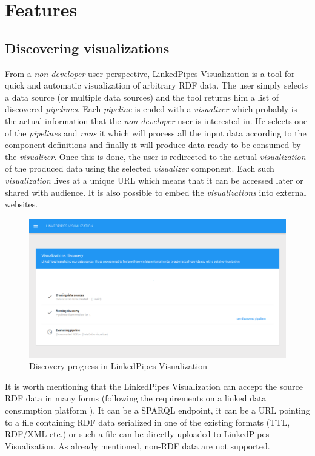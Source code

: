 \section{Features}

\subsection{Discovering visualizations}

From a \emph{non-developer} user perspective, LinkedPipes Visualization is a tool for quick and automatic visualization of arbitrary RDF data. The user simply selects a data source (or multiple data sources) and the tool returns him a list of discovered \emph{pipelines}. Each \emph{pipeline} is ended with a \emph{visualizer} which probably is the actual information that the \emph{non-developer} user is interested in. He selects one of the \emph{pipelines} and \emph{runs} it which will process all the input data according to the component definitions and finally it will produce data ready to be consumed by the \emph{visualizer}. Once this is done, the user is redirected to the actual \emph{visualization} of the produced data using the selected \emph{visualizer} component. Each such \emph{visualization} lives at a unique URL which means that it can be accessed later or shared with audience. It is also possible to embed the \emph{visualizations} into external websites.

\begin{figure}
	\centering
	\includegraphics[width=130mm]{img/03_linked_pipes_discovery.png}
	\caption{Discovery progress in LinkedPipes Visualization} 
	\label{fig:linked-pipes-discovery}
\end{figure}

It is worth mentioning that the LinkedPipes Visualization can accept the source RDF data in many forms (following the requirements on a linked data consumption platform \cite{requirements_on_ldcp}). It can be a SPARQL endpoint, it can be a URL pointing to a file containing RDF data serialized in one of the existing formats (TTL, RDF/XML etc.) or such a file can be directly uploaded to LinkedPipes Visualization. As already mentioned, non-RDF data are not supported.

